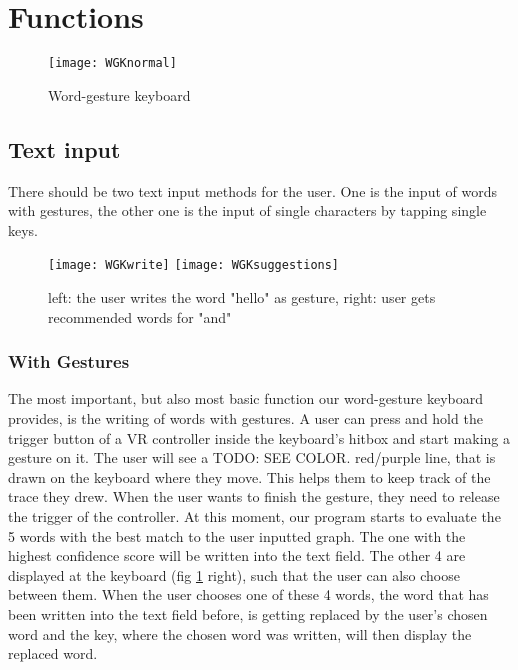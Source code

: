 \section{Functions}
\begin{figure}
\centering
\texttt{[image: WGKnormal]}
\caption{Word-gesture keyboard}
\end{figure}
    
\subsection{Text input}
There should be two text input methods for the user. One is the input of words with gestures, the other one is the input of single characters by tapping single keys.

\begin{figure}
\centering
\texttt{[image: WGKwrite]}
\texttt{[image: WGKsuggestions]}
\caption{left: the user writes the word "hello" as gesture, right: user gets recommended words for "and"}
\label{fig:write_suggestions}
\end{figure}

\subsubsection{With Gestures}
The most important, but also most basic function our word-gesture keyboard provides, is the writing of words with gestures. A user can press and hold the trigger button of a VR controller inside the keyboard's hitbox and start making a gesture on it. The user will see a TODO: SEE COLOR. red/purple line, that is drawn on the keyboard where they move. This helps them to keep track of the trace they drew. When the user wants to finish the gesture, they need to release the trigger of the controller. At this moment, our program starts to evaluate the 5 words with the best match to the user inputted graph. The one with the highest confidence score will be written into the text field. The other 4 are displayed at the keyboard (fig \ref{fig:write_suggestions} right), such that the user can also choose between them. When the user chooses one of these 4 words, the word that has been written into the text field before, is getting replaced by the user's chosen word and the key, where the chosen word was written, will then display the replaced word.
